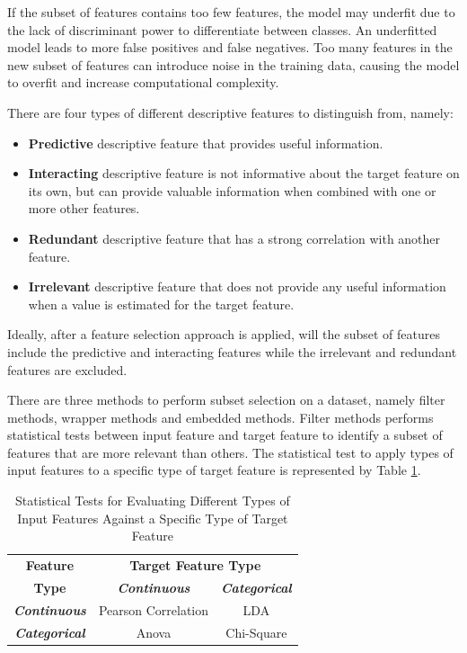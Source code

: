 \documentclass[10pt, conference]{IEEEtran}
\begin{document}
If the subset of features contains too few features, the model may underfit due to the lack of
discriminant power to differentiate between classes. An underfitted model leads to more false
positives and false negatives. Too many features in the new subset of features can introduce
noise in the training data, causing the model to overfit and increase computational complexity.

There are four types of different descriptive features to distinguish from, namely:
\begin{itemize}
    \item \textbf{Predictive} descriptive feature that provides useful information.
    \item \textbf{Interacting} descriptive feature is not informative about the target feature on its own,
          but can provide valuable information when combined with one or more other features.
    \item \textbf{Redundant} descriptive feature that has a strong correlation with another feature.
    \item \textbf{Irrelevant} descriptive feature that does not provide any useful information when a value
           is estimated for the target feature.
\end{itemize}
Ideally, after a feature selection approach is applied, will the subset of features include the predictive and
interacting features while the irrelevant and redundant features are excluded.

There are three methods to perform subset selection on a dataset, namely filter methods, wrapper methods and
embedded methods. Filter methods performs statistical tests between input feature and target feature to
identify a subset of features that are more relevant than others. The statistical test to apply types
of input features to a specific type of target feature is represented by Table \ref{tab:feature_selection_table}.
\begin{table}[h!]
    \caption{Statistical Tests for Evaluating Different Types of Input Features Against a Specific Type of Target Feature}
    \begin{center}
        \begin{tabular}{|c||c|c|}
            \hline
            \textbf{Feature}&\multicolumn{2}{|c|}{\textbf{Target Feature Type}} \\
            \cline{2-3} 
            \textbf{Type} & \textbf{\textit{Continuous}}& \textbf{\textit{Categorical}} \\
            \hline
            \textbf{\textit{Continuous}}& Pearson Correlation& LDA\\
            \hline
            \textbf{\textit{Categorical}}& Anova & Chi-Square\\
            \hline
        \end{tabular}
        \label{tab:feature_selection_table}
    \end{center}
\end{table}
\end{document}
